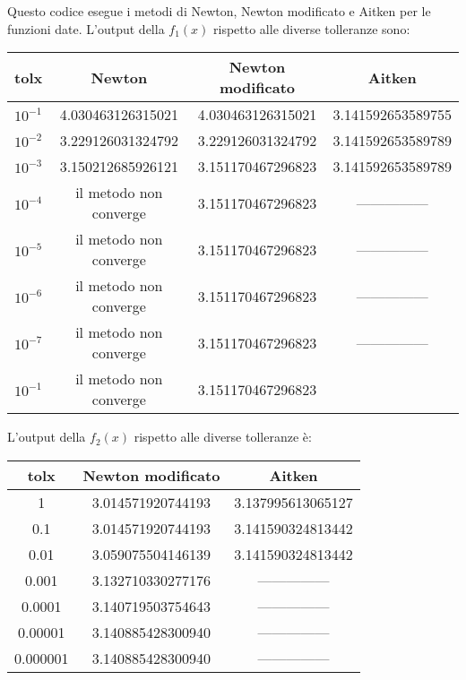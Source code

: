 
Questo codice esegue i metodi di Newton, Newton modificato e Aitken per le funzioni date. \newline
L'output della $f_{1}(x)$ rispetto alle diverse tolleranze sono:

\begin{center}
\begin{tabular}{|c|c|c|c|}
\hline
tolx & Newton & Newton modificato & Aitken \\
\hline
$10^{-1}$ & 4.030463126315021 & 4.030463126315021 & 3.141592653589755 \\
$10^{-2}$ & 3.229126031324792 & 3.229126031324792 & 3.141592653589789 \\
$10^{-3}$ & 3.150212685926121 & 3.151170467296823 & 3.141592653589789 \\
$10^{-4}$ & il metodo non converge & 3.151170467296823 & --------------- \\ 
$10^{-5}$ & il metodo non converge & 3.151170467296823 & --------------- \\
$10^{-6}$ & il metodo non converge & 3.151170467296823 & --------------- \\
$10^{-7}$ & il metodo non converge & 3.151170467296823 & --------------- \\
$10^{-1}$ & il metodo non converge & 3.151170467296823 & \\
\hline
\end{tabular}
\end{center}

L'output della \(f_{2}(x)\) rispetto alle diverse tolleranze è: \newline

\begin{center}
\begin{tabular}{c|c|c}
\hline
tolx & Newton modificato & Aitken \\
\hline
1 & 3.014571920744193 & 3.137995613065127 \\
0.1 & 3.014571920744193 & 3.141590324813442 \\
0.01 & 3.059075504146139 & 3.141590324813442 \\
0.001 & 3.132710330277176 & --------------- \\ 
0.0001 & 3.140719503754643 & --------------- \\
0.00001 & 3.140885428300940 & --------------- \\
0.000001 & 3.140885428300940 & --------------- \\
\end{tabular} \\
\end{center}

